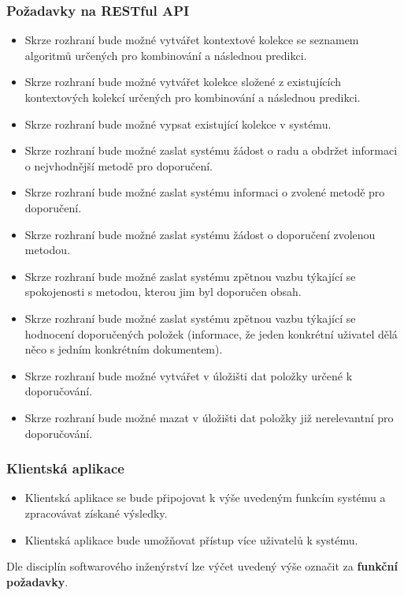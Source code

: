 \documentclass[thesis=M,czech]{FITthesis}[2014/05/07]
\begin{document}
\subsubsection{Požadavky na RESTful API}
\begin{itemize}
	\item Skrze rozhraní bude možné vytvářet kontextové kolekce se seznamem algoritmů určených pro kombinování a následnou predikci.
	\item Skrze rozhraní bude možné vytvářet kolekce složené z existujících kontextových kolekcí určených pro kombinování a následnou predikci.
	\item Skrze rozhraní bude možné vypsat existující kolekce v systému.		
	\item Skrze rozhraní bude možné zaslat systému žádost o radu a obdržet informaci o nejvhodnější metodě pro doporučení.
	\item Skrze rozhraní bude možné zaslat systému informaci o zvolené metodě pro doporučení.
	\item Skrze rozhraní bude možné zaslat systému žádost o doporučení zvolenou metodou.	
	\item Skrze rozhraní bude možné zaslat systému zpětnou vazbu týkající se spokojenosti s metodou, kterou jim byl doporučen obsah.
	\item Skrze rozhraní bude možné zaslat systému zpětnou vazbu týkající se hodnocení doporučených položek (informace, že jeden konkrétní uživatel dělá něco s jedním konkrétním dokumentem).
	\item Skrze rozhraní bude možné vytvářet v úložišti dat položky určené k doporučování. 
	\item Skrze rozhraní bude možné mazat v úložišti dat položky již nerelevantní pro doporučování. 
\end{itemize}

\subsubsection{Klientská aplikace}
\begin{itemize}
	\item Klientská aplikace se bude připojovat k výše uvedeným funkcím systému a zpracovávat získané výsledky.
	\item Klientská aplikace bude umožňovat přístup více uživatelů k systému.	
\end{itemize}	

Dle disciplín softwarového inženýrství lze výčet uvedený výše označit za \textbf{funkční požadavky}.
\end{document}
